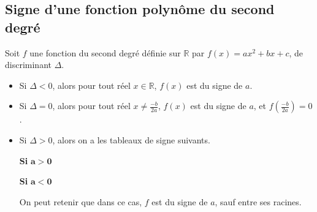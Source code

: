 \documentclass[11pt]{article}
\begin{document}
\subsection{Signe d'une fonction polynôme du second degré}
\begin{propadm}
  Soit $f$ une fonction du second degré définie sur $\mathbb{R}$ par
    $f(x)=ax^2+bx+c$,
  de discriminant $\Delta$.
  \begin{itemize}
    \item Si $\Delta<0$, alors pour tout réel $x\in\mathbb{R}$, $f(x)$ est du
      signe de $a$.
    \item Si $\Delta=0$, alors pour tout réel $x\neq\frac{-b}{2a}$, $f(x)$ est
      du signe de $a$, et $f(\frac{-b}{2a})=0$.
    \item Si $\Delta>0$, alors on a les tableaux de signe suivants.

      \noindent
  \begin{minipage}[t]{.47\textwidth}
    \begin{center}
      {\bf Si} $\mathbf{a>0}$\vspace{.2cm}

    \end{center}
  \vspace{.2cm}
  \end{minipage}
    \hfill
  \begin{minipage}[t]{.47\textwidth}
    \begin{center}
      {\bf Si} $\mathbf{a<0}$\vspace{.2cm}

    \end{center}
  \vspace{.2cm}
  \end{minipage}
  On peut retenir que dans ce cas, $f$ est du signe de $a$, sauf entre ses
  racines.
  \end{itemize}
\end{propadm}
\end{document}
